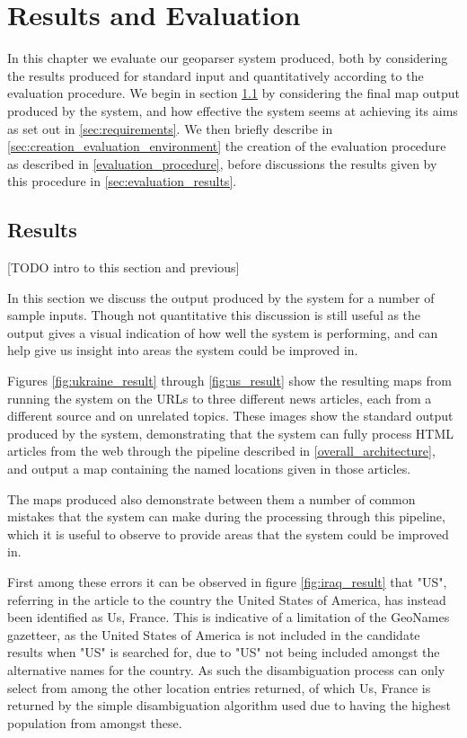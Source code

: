 \documentclass[12pt, a4paper]{report}
\begin{document}
\chapter{Results and Evaluation}

In this chapter we evaluate our geoparser system produced, both by considering the results produced for standard input and quantitatively according to the evaluation procedure. We begin in section \ref{sec:results} by considering the final map output produced by the system, and how effective the system seems at achieving its aims as set out in \ref{sec:requirements}. We then briefly describe in \ref{sec:creation_evaluation_environment} the creation of the evaluation procedure as described in \ref{evaluation_procedure}, before discussions the results given by this procedure in \ref{sec:evaluation_results}.

\section{Results}
\label{sec:results}

[TODO intro to this section and previous]

In this section we discuss the output produced by the system for a number of sample inputs. Though not quantitative this discussion is still useful as the output gives a visual indication of how well the system is performing, and can help give us insight into areas the system could be improved in.

Figures \ref{fig:ukraine_result} through \ref{fig:us_result} show the resulting maps from running the system on the URLs to three different news articles, each from a different source and on unrelated topics. These images show the standard output produced by the system, demonstrating that the system can fully process HTML articles from the web through the pipeline described in \ref{overall_architecture}, and output a map containing the named locations given in those articles.

The maps produced also demonstrate between them a number of common mistakes that the system can make during the processing through this pipeline, which it is useful to observe to provide areas that the system could be improved in.

First among these errors it can be observed in figure \ref{fig:iraq_result} that "US", referring in the article to the country the United States of America, has instead been identified as Us, France. This is indicative of a limitation of the GeoNames gazetteer, as the United States of America is not included in the candidate results when "US" is searched for, due to "US" not being included amongst the alternative names for the country. As such the disambiguation process can only select from among the other location entries returned, of which Us, France is returned by the simple disambiguation algorithm used due to having the highest population from amongst these.
\end{document}
